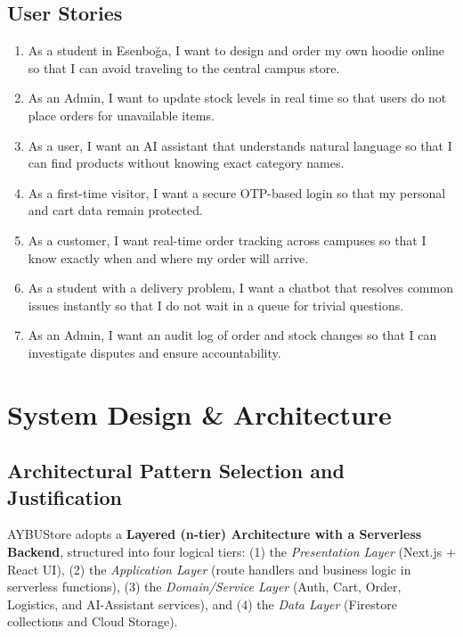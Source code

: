 \documentclass[11pt,a4paper]{article}
\begin{document}
\subsection{User Stories}
\begin{enumerate}
    \item As a student in Esenboğa, I want to design and order my own hoodie online so that I can avoid traveling to the central campus store.
    \item As an Admin, I want to update stock levels in real time so that users do not place orders for unavailable items.
    \item As a user, I want an AI assistant that understands natural language so that I can find products without knowing exact category names.
    \item As a first-time visitor, I want a secure OTP-based login so that my personal and cart data remain protected.
    \item As a customer, I want real-time order tracking across campuses so that I know exactly when and where my order will arrive.
    \item As a student with a delivery problem, I want a chatbot that resolves common issues instantly so that I do not wait in a queue for trivial questions.
    \item As an Admin, I want an audit log of order and stock changes so that I can investigate disputes and ensure accountability.
\end{enumerate}
 
\section{System Design \& Architecture}
\label{sec:system-design}
 
\subsection{Architectural Pattern Selection and Justification}
AYBUStore adopts a \textbf{Layered (n-tier) Architecture with a Serverless Backend}, structured into four logical tiers: (1) the \textit{Presentation Layer} (Next.js + React UI), (2) the \textit{Application Layer} (route handlers and business logic in serverless functions), (3) the \textit{Domain/Service Layer} (Auth, Cart, Order, Logistics, and AI-Assistant services), and (4) the \textit{Data Layer} (Firestore collections and Cloud Storage).
 
\end{document}
